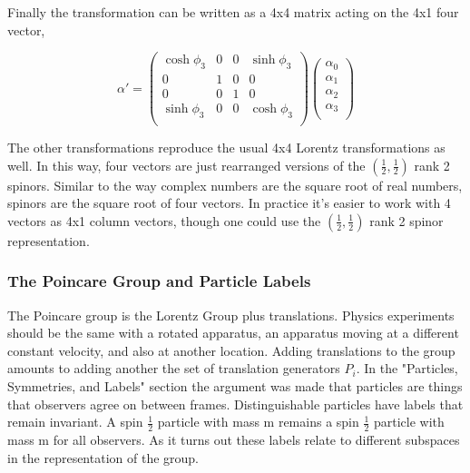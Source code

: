Finally the transformation can be written as a 4x4 matrix acting on the 4x1 four vector,

\begin{equation}
\alpha' = 
\begin{pmatrix}
\cosh\phi_3 & 0 & 0 & \sinh\phi_3 \\
0 & 1 & 0 & 0 \\
0 & 0 & 1 & 0 \\
\sinh\phi_3 & 0 & 0 & \cosh\phi_3 \\
\end{pmatrix}
\begin{pmatrix}
\alpha_0 \\
\alpha_1 \\
\alpha_2 \\
\alpha_3 \\
\end{pmatrix}
\end{equation}

The other transformations reproduce the usual 4x4 Lorentz transformations as well. In this way, four vectors are just rearranged versions of the $(\frac{1}{2}, \frac{1}{2})$ rank 2 spinors. Similar to the way complex numbers are the square root of real numbers, spinors are the square root of four vectors. In practice it's easier to work with 4 vectors as 4x1 column vectors, though one could use the $(\frac{1}{2}, \frac{1}{2})$ rank 2 spinor representation.  

\subsubsection{The Poincare Group and Particle Labels}

The Poincare group is the Lorentz Group plus translations. Physics experiments should be the same with a rotated apparatus, an apparatus moving at a different constant velocity, and also at another location. Adding translations to the group amounts to adding another the set of translation generators $P_i$. In the "Particles, Symmetries, and Labels" section the argument was made that particles are things that observers agree on between frames. Distinguishable particles have labels that remain invariant. A spin $\frac{1}{2}$ particle with mass m remains a spin $\frac{1}{2}$ particle with mass m for all observers. As it turns out these labels relate to different subspaces in the representation of the group.

